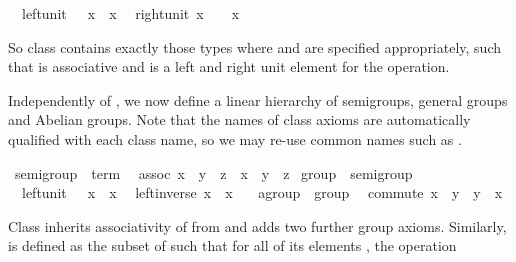 \begin{isabellebody}
\ \ left{\isacharunderscore}unit{\isacharcolon}\ {\isachardoublequote}{\isasymunit}\ {\isasymodot}\ x\ {\isacharequal}\ x{\isachardoublequote}\isanewline
\ \ right{\isacharunderscore}unit{\isacharcolon}\ {\isachardoublequote}x\ {\isasymodot}\ {\isasymunit}\ {\isacharequal}\ x{\isachardoublequote}%
\begin{isamarkuptext}%
\noindent So class  contains exactly those types \isa{{\isasymtau}} where \isa{{\isasymodot}\ {\isasymColon}\ {\isasymtau}\ {\isasymRightarrow}\ {\isasymtau}\ {\isasymRightarrow}\ {\isasymtau}} and \isa{{\isasymunit}\ {\isasymColon}\ {\isasymtau}} are
 specified appropriately, such that \isa{{\isasymodot}} is associative and
 \isa{{\isasymunit}} is a left and right unit element for the \isa{{\isasymodot}}
 operation.%
\end{isamarkuptext}%
%
\begin{isamarkuptext}%
\medskip Independently of , we now define a linear
 hierarchy of semigroups, general groups and Abelian groups.  Note
 that the names of class axioms are automatically qualified with each
 class name, so we may re-use common names such as .%
\end{isamarkuptext}%
\ semigroup\ {\isacharless}\ {\isachardoublequote}term{\isachardoublequote}\isanewline
\ \ assoc{\isacharcolon}\ {\isachardoublequote}{\isacharparenleft}x\ {\isasymodot}\ y{\isacharparenright}\ {\isasymodot}\ z\ {\isacharequal}\ x\ {\isasymodot}\ {\isacharparenleft}y\ {\isasymodot}\ z{\isacharparenright}{\isachardoublequote}\isanewline
\isanewline
{}\ group\ {\isacharless}\ semigroup\isanewline
\ \ left{\isacharunderscore}unit{\isacharcolon}\ {\isachardoublequote}{\isasymunit}\ {\isasymodot}\ x\ {\isacharequal}\ x{\isachardoublequote}\isanewline
\ \ left{\isacharunderscore}inverse{\isacharcolon}\ {\isachardoublequote}x{\isasyminv}\ {\isasymodot}\ x\ {\isacharequal}\ {\isasymunit}{\isachardoublequote}\isanewline
\isanewline
{}\ agroup\ {\isacharless}\ group\isanewline
\ \ commute{\isacharcolon}\ {\isachardoublequote}x\ {\isasymodot}\ y\ {\isacharequal}\ y\ {\isasymodot}\ x{\isachardoublequote}%
\begin{isamarkuptext}%
\noindent Class  inherits associativity of \isa{{\isasymodot}}
 from  and adds two further group axioms. Similarly,
  is defined as the subset of  such that
 for all of its elements \isa{{\isasymtau}}, the operation \isa{{\isasymodot}\ {\isasymColon}\ {\isasymtau}\ {\isasymRightarrow}\ {\isasymtau}\ {\isasymRightarrow}\ {\isasymtau}}

\end{isamarkuptext}
\end{isabellebody}
